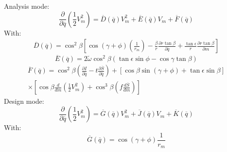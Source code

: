 \documentclass{report}
\begin{document}
        Analysis mode:
        \begin{equation}
            \frac{\partial}{\partial \overline{q}} \left(\frac{1}{2}V_m^2\right) = 
            \overline{D}\left(\overline{q}\right) V_m^2 + \overline{E}\left(\overline{q}\right) V_m + \overline{F}\left(\overline{q}\right)
            \label{eq:analysis}
        \end{equation}
        With:
        \begin{equation}
            \begin{multlined}
                \overline{D}\left(\overline{q}\right) = \cos ^2 \beta \left[
                   \cos \left(\gamma+\phi\right)\left(\frac{1}{r_m}\right)
                    -\frac{\beta}{r}\frac{\partial r \tan \beta}{\partial \overline{q}}
                    +\frac{\tan \epsilon}{r} \frac{\partial r \tan \beta}{\partial m}
                    \right]
            \end{multlined}
        \end{equation}
        \begin{equation}
            \overline{E} \left(\overline{q}\right) = 2 \widetilde{\omega} \cos^2 \beta \left(\tan \epsilon \sin \phi - \cos \gamma \tan \beta\right)
        \end{equation}
        \begin{equation}
            \begin{multlined}
                \overline{F} \left(\overline{q}\right) = \cos ^2 \beta \left(\frac{\partial I}{\partial \overline{q}} - t \frac{\partial \overline{S} }{\partial \overline{q}} \right)
                + \left[
                    \cos \beta \sin \left( \gamma + \phi \right) + \tan \epsilon \sin \beta 
                    \right] 
                \\ \times \left[
                    \cos \beta \frac{d}{dm} \left(\frac{1}{2}V_m^2\right)  + \cos^3 \beta \left(f \frac{d\overline{S}}{dm}\right)
                \right]
            \end{multlined}
        \end{equation}
        Design mode:
        \begin{equation}
            \frac{\partial}{\partial \overline{q}} \left(\frac{1}{2}V_m^2\right) = \overline{G} \left(\overline{q}\right) V_m^2 + \overline{J} \left(\overline{q}\right) V_m + \overline{K} \left(\overline{q}\right)
        \end{equation}
        With:
        \begin{equation}
            \overline{G}\left(\overline{q}\right) = \cos \left(\gamma + \phi\right) \frac{1}{r_m}
        \end{equation}
\end{document}
